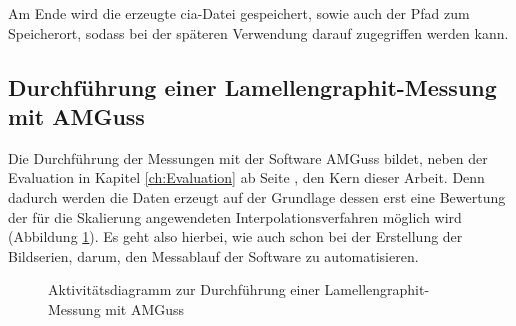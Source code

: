 \documentclass[
fontsize=10pt, 
listof = totoc,
parskip = half	
]{report}
\begin{document}
\noindent Am Ende wird die erzeugte cia-Datei gespeichert, sowie auch der Pfad zum Speicherort, sodass bei der späteren Verwendung darauf zugegriffen werden kann.

\subsection{Durchführung einer Lamellengraphit-Messung mit AMGuss}
\label{subsec:FlowLamellengussmessung}
Die Durchführung der Messungen mit der Software AMGuss bildet, neben der Evaluation in Kapitel \ref{ch:Evaluation} ab Seite \pageref{ch:Evaluation}, den Kern dieser Arbeit.  Denn dadurch werden die Daten erzeugt auf der Grundlage dessen erst eine Bewertung der für die Skalierung angewendeten Interpolationsverfahren möglich wird (Abbildung \ref{fig:FlowLamellengussMessung}). Es geht also hierbei, wie auch schon bei der Erstellung der Bildserien, darum, den Messablauf der Software zu automatisieren.

\begin{figure}[H]
	\centering
	\caption{Aktivitätsdiagramm zur Durchführung einer Lamellengraphit-Messung mit AMGuss}
	\label{fig:FlowLamellengussMessung}
\end{figure}
\end{document}
